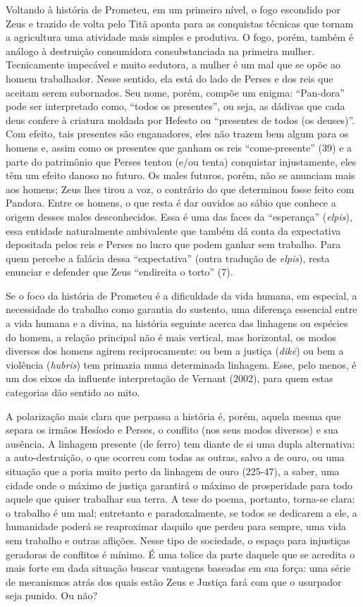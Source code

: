 Voltando à história de Prometeu, em um primeiro nível, o fogo escondido
por Zeus e trazido de volta pelo Titã aponta para as conquistas técnicas
que tornam a agricultura uma atividade mais simples e produtiva. O fogo,
porém, também é análogo à destruição consumidora consubstanciada na
primeira mulher. Tecnicamente impecável e muito sedutora, a mulher é um
mal que se opõe ao homem trabalhador. Nesse sentido, ela está do lado de
Perses e dos reis que aceitam serem subornados. Seu nome, porém, compõe
um enigma: ``Pan-dora'' pode ser interpretado como, ``todos os
presentes'', ou seja, as dádivas que cada deus confere à criatura
moldada por Hefesto ou ``presentes de todos (os deuses)''. Com efeito,
tais presentes são enganadores, eles não trazem bem algum para os homens
e, assim como os presentes que ganham os reis ``come-presente'' (39) e a
parte do patrimônio que Perses tentou (e/ou tenta) conquistar
injustamente, eles têm um efeito danoso no futuro. Os males futuros,
porém, não se anunciam mais aos homens; Zeus lhes tirou a voz, o
contrário do que determinou fosse feito com Pandora. Entre os homens, o
que resta é dar ouvidos ao sábio que conhece a origem desses males
desconhecidos. Essa é uma das faces da ``esperança'' (\emph{elpis}),
essa entidade naturalmente ambivalente que também dá conta da
expectativa depositada pelos reis e Perses no lucro que podem ganhar sem
trabalho. Para quem percebe a falácia dessa ``expectativa'' (outra
tradução de \emph{elpis}), resta enunciar e defender que Zeus
``endireita o torto'' (7).

Se o foco da história de Prometeu é a dificuldade da vida humana, em
especial, a necessidade do trabalho como garantia do sustento, uma
diferença essencial entre a vida humana e a divina, na história seguinte
acerca das linhagens ou espécies do homem, a relação principal não é
mais vertical, mas horizontal, os modos diversos dos homens agirem
reciprocamente: ou bem a justiça (\emph{dikē}) ou bem a violência
(\emph{hubris}) tem primazia numa determinada linhagem. Esse, pelo
menos, é um dos eixos da influente interpretação de Vernant (2002), para
quem estas categorias dão sentido ao mito.

A polarização mais clara que perpassa a história é, porém, aquela mesma
que separa os irmãos Hesíodo e Perses, o conflito (nos seus modos
diversos) e sua ausência. A linhagem presente (de ferro) tem diante de
si uma dupla alternativa: a auto-destruição, o que ocorreu com todas as
outras, salvo a de ouro, ou uma situação que a poria muito perto da
linhagem de ouro (225-47), a saber, uma cidade onde o máximo de justiça
garantirá o máximo de prosperidade para todo aquele que quiser trabalhar
sua terra. A tese do poema, portanto, torna-se clara: o trabalho é um
mal; entretanto e paradoxalmente, se todos se dedicarem a ele, a
humanidade poderá se reaproximar daquilo que perdeu para sempre, uma
vida sem trabalho e outras aflições. Nesse tipo de sociedade, o espaço
para injustiças geradoras de conflitos é mínimo. É uma tolice da parte
daquele que se acredita o mais forte em dada situação buscar vantagens
baseadas em sua força: uma série de mecanismos atrás dos quais estão
Zeus e Justiça fará com que o usurpador seja punido. Ou não?

